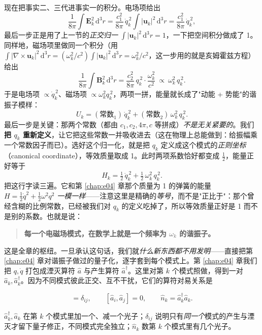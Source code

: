 现在把事实二、三代进事实一的积分。电场项给出
\[
  \frac1{8\pi}\int\bm E_k^2\,\mathrm d^3r
  =\frac{c_1^2}{8\pi}\,\dot q_k^{\,2}\int|\bm u_k|^2\,\mathrm d^3r
  =\frac{c_1^2}{8\pi}\,\dot q_k^{\,2},
\]
最后一步正是用了上一节的\emph{正交归一} \(\int|\bm u_k|^2\,\mathrm d^3r=1\)，一下把空间积分做成了 1。同样地，磁场项里做同一个积分（用 \(\int|\nabla\times\bm u_k|^2\,\mathrm d^3r=(\omega_k^2/c^2)\int|\bm u_k|^2\,\mathrm d^3r=\omega_k^2/c^2\)，这一步用的就是亥姆霍兹方程）给出
\[
  \frac1{8\pi}\int\bm B_k^2\,\mathrm d^3r
  =\frac{c_2^2}{8\pi}\,q_k^{\,2}\cdot\frac{\omega_k^2}{c^2}
  \ \propto\ \omega_k^2\,q_k^{\,2}.
\]
于是电场项 \(\propto\dot q_k^{\,2}\)、磁场项 \(\propto\omega_k^2 q_k^{\,2}\)，两项一拼，能量就长成了"动能 + 势能"的谐振子模样：
\[
  U_k=(\text{常数}_1)\,\dot q_k^{\,2}+(\text{常数}_2)\,\omega_k^2\,q_k^{\,2}.
\]
最后一步是关键：那两个常数（都由 \(c_1,c_2,4\pi,c\) 等拼成）\emph{不是无关紧要的}。我们\textbf{把 \(q_k\) 重新定义}，让它把这些常数一并吸收进去（这在物理上总能做到：给振幅乘一个常数因子而已）。选好这个归一化，就是把 \(q_k\) 定义成这个模式的\emph{正则坐标}（canonical coordinate），等效质量取成 1。此时两项系数恰好都变成 \(\tfrac12\)，能量正好等于
\[
  H_k=\tfrac12\,\dot q_k^{\,2}+\tfrac12\,\omega_k^2\,q_k^{\,2}.
\]
把这行字读三遍。它和第 \ref{chap:e04} 章那个质量为 1 的弹簧的能量 \(H=\tfrac12\dot q^2+\tfrac12\omega^2 q^2\) \emph{一模一样}——注意这里是精确的\emph{等号}，而不是"正比于"：那个曾经含糊的比例常数，已经被我们对 \(q_k\) 的定义吃掉了，所以等效质量正好是 1 而不是别的系数。也就是说：

\begin{quote}
\textbf{每一个电磁场模式，在数学上就是一个频率为 \(\omega_k\) 的谐振子。}
\end{quote}

这是全章的枢纽。一旦承认这句话，我们就\emph{什么新东西都不用发明}——直接把第 \ref{chap:e04} 章对谐振子做过的量子化，逐字套到每个模式上。第 \ref{chap:e04} 章我们把 \(q,\dot q\) 打包成湮灭算符 \(\hat a\) 与产生算符 \(\hat a^\dagger\)。这里对第 \(k\) 个模式照做，得到一对 \(\hat a_k,\hat a_k^\dagger\)。因为不同模式彼此正交、互不干扰，它们的算符对易关系是

\begin{equation}
  [\hat a_i,\hat a_j^\dagger]=\delta_{ij},\qquad
  [\hat a_i,\hat a_j]=0,\qquad
  \hat n_k=\hat a_k^\dagger\hat a_k .
  \label{eq:e05-commutator}
\end{equation}
\begin{formulaexplain}
\(\hat a_k^\dagger,\hat a_k\) 在第 \(k\) 个模式里加一个、减一个光子；\(\delta_{ij}\) 说明只有\emph{同一个}模式的产生与湮灭才留下量子修正，不同模式完全独立；\(\hat n_k\) 数第 \(k\) 个模式里有几个光子。
\end{formulaexplain}

